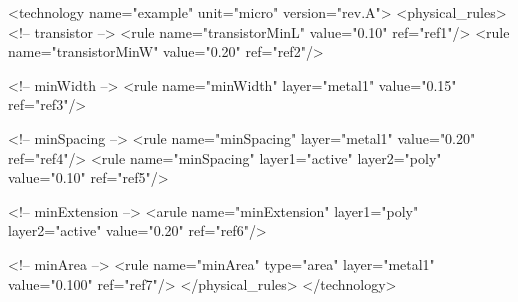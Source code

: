 \begin{DoxyCodeInclude}
<\textcolor{keywordtype}{technology} \textcolor{keyword}{name}=\textcolor{stringliteral}{"example"} \textcolor{keyword}{unit}=\textcolor{stringliteral}{"micro"} \textcolor{keyword}{version}=\textcolor{stringliteral}{"rev.A"}>
   <\textcolor{keywordtype}{physical\_rules}>
     \textcolor{comment}{<!-- transistor -->}
     <\textcolor{keywordtype}{rule}  \textcolor{keyword}{name}=\textcolor{stringliteral}{"transistorMinL"}                                         \textcolor{keyword}{value}=\textcolor{stringliteral}{"0.10"}   \textcolor{keyword}{ref}=\textcolor{stringliteral}{"ref1"}/> 
     <\textcolor{keywordtype}{rule}  \textcolor{keyword}{name}=\textcolor{stringliteral}{"transistorMinW"}                                         \textcolor{keyword}{value}=\textcolor{stringliteral}{"0.20"}   \textcolor{keyword}{ref}=\textcolor{stringliteral}{"ref2"}/>

     \textcolor{comment}{<!-- minWidth -->}
     <\textcolor{keywordtype}{rule}  \textcolor{keyword}{name}=\textcolor{stringliteral}{"minWidth"}           \textcolor{keyword}{layer}=\textcolor{stringliteral}{"metal1"}                      \textcolor{keyword}{value}=\textcolor{stringliteral}{"0.15"}   \textcolor{keyword}{ref}=\textcolor{stringliteral}{"ref3"}/>

     \textcolor{comment}{<!-- minSpacing -->}
     <\textcolor{keywordtype}{rule}  \textcolor{keyword}{name}=\textcolor{stringliteral}{"minSpacing"}         \textcolor{keyword}{layer}=\textcolor{stringliteral}{"metal1"}                      \textcolor{keyword}{value}=\textcolor{stringliteral}{"0.20"}   \textcolor{keyword}{ref}=\textcolor{stringliteral}{"ref4"}/>
     <\textcolor{keywordtype}{rule}  \textcolor{keyword}{name}=\textcolor{stringliteral}{"minSpacing"}         \textcolor{keyword}{layer1}=\textcolor{stringliteral}{"active"}   \textcolor{keyword}{layer2}=\textcolor{stringliteral}{"poly"}     \textcolor{keyword}{value}=\textcolor{stringliteral}{"0.10"}   \textcolor{keyword}{ref}=\textcolor{stringliteral}{"ref5"}/>

     \textcolor{comment}{<!-- minExtension -->}
     <\textcolor{keywordtype}{arule} \textcolor{keyword}{name}=\textcolor{stringliteral}{"minExtension"}       \textcolor{keyword}{layer1}=\textcolor{stringliteral}{"poly"}     \textcolor{keyword}{layer2}=\textcolor{stringliteral}{"active"}   \textcolor{keyword}{value}=\textcolor{stringliteral}{"0.20"}   \textcolor{keyword}{ref}=\textcolor{stringliteral}{"ref6"}/>

     \textcolor{comment}{<!-- minArea -->}
     <\textcolor{keywordtype}{rule}  \textcolor{keyword}{name}=\textcolor{stringliteral}{"minArea"}            \textcolor{keyword}{type}=\textcolor{stringliteral}{"area"}       \textcolor{keyword}{layer}=\textcolor{stringliteral}{"metal1"}    \textcolor{keyword}{value}=\textcolor{stringliteral}{"0.100"}  \textcolor{keyword}{ref}=\textcolor{stringliteral}{"ref7"}/>
  </\textcolor{keywordtype}{physical\_rules}>
</\textcolor{keywordtype}{technology}>

\end{DoxyCodeInclude}


